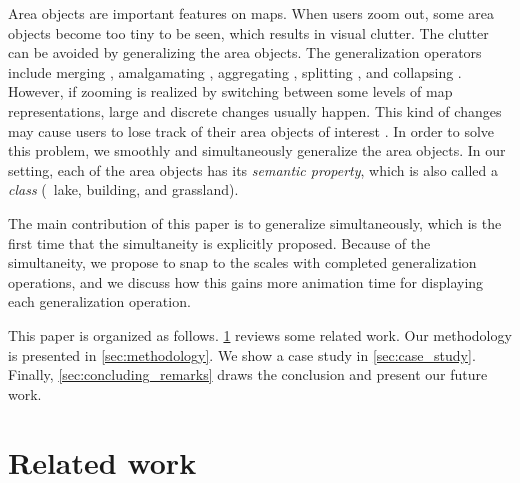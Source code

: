 \documentclass[twocolumn]{svjour3}          %
\begin{document}


Area objects are important features on maps. 
When users zoom out,
some area objects become too tiny to be seen,
which results in visual clutter.
The clutter can be avoided by generalizing the 
area objects.
The generalization operators include
merging \citep[\eg][]{HaunertWolff2010AreaAgg}, 
amalgamating \citep[\eg][]{Ware1995Areal}, 
aggregating \citep[\eg][]{Peng2017Building}, 
splitting \citep[\eg][]{Meijers2016Split}, 
and collapsing \citep[\eg][]{Haunert2008Skeleton}.
However, if zooming is realized by switching between
some levels of map representations, 
large and discrete changes usually happen.
This kind of changes may cause users to lose track of
their area objects of interest \citep{vanKreveld2001}.
In order to solve this problem, 
we smoothly and simultaneously generalize the area objects.
In our setting, each of the area objects has its \emph{semantic property},
which is also called a \emph{class} (\eg\ lake, building, and grassland).


The main contribution of this paper is 
to generalize simultaneously,
which is the first time that the simultaneity 
is explicitly proposed.
Because of the simultaneity, 
we propose to snap to the scales with completed generalization operations,
and we discuss how this gains more animation time 
for displaying each generalization operation.


This paper is organized as follows.
\sect\ref{sec:related_work} reviews some related work.
Our methodology is presented in \sect\ref{sec:methodology}.
We show a case study in \sect\ref{sec:case_study}.
Finally, \sect\ref{sec:concluding_remarks} draws the conclusion
and present our future work.



\section{Related work}
\label{sec:related_work}

\end{document}
